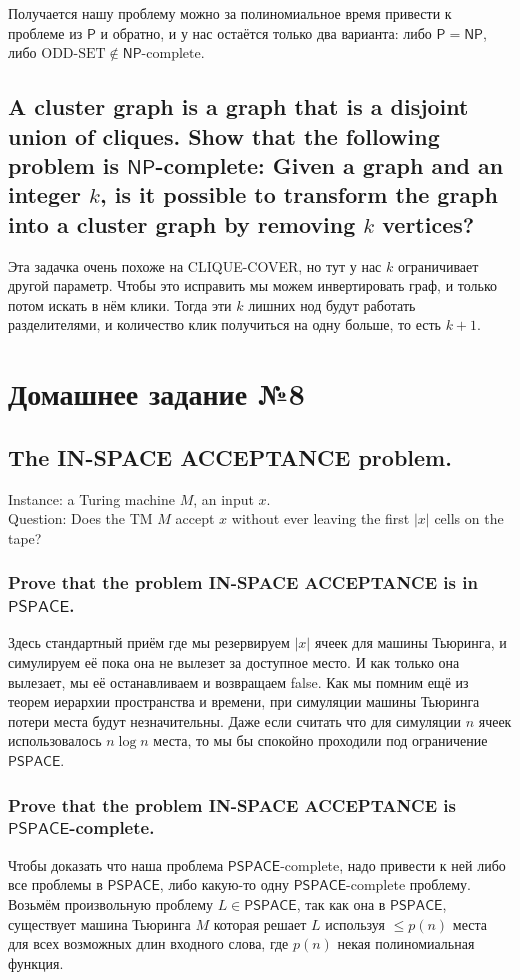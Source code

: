 \documentclass{article}
\newcommand{\NP}{\ensuremath{\mathsf{NP}}}
\newcommand{\PSPACE}{\ensuremath{\mathsf{PSPACE}}}
\renewcommand{\P}{\ensuremath{\mathsf{P}}}
\begin{document}
  Получается нашу проблему можно за полиномиальное время привести к проблеме из \P{} и обратно, и у нас остаётся только два варианта: либо $\P = \NP$, либо $\textrm{ODD-SET} \not\in \NP\textrm{-complete}$.

  \subsection{A cluster graph is a graph that is a disjoint union of cliques. Show that the following problem is \NP-complete: Given a graph and an integer $k$, is it possible to transform the graph into a cluster graph by removing $k$ vertices?}
  Эта задачка очень похоже на CLIQUE-COVER, но тут у нас $k$ ограничивает другой параметр.
  Чтобы это исправить мы можем инвертировать граф, и только потом искать в нём клики.
  Тогда эти $k$ лишних нод будут работать разделителями, и количество клик получиться на одну больше, то есть $k+1$.

  \section{Домашнее задание №8}
  \setcounter{subsection}{7}
  \subsection{The IN-SPACE ACCEPTANCE problem.}
  Instance: a Turing machine $M$, an input $x$.\\
  Question: Does the TM $M$ accept $x$ without ever leaving the first $|x|$ cells on the tape?

  \subsubsection{Prove that the problem IN-SPACE ACCEPTANCE is in \PSPACE.}
  Здесь стандартный приём где мы резервируем $|x|$ ячеек для машины Тьюринга, и симулируем её пока она не вылезет за доступное место.
  И как только она вылезает, мы её останавливаем и возвращаем false.
  Как мы помним ещё из теорем иерархии пространства и времени, при симуляции машины Тьюринга потери места будут незначительны.
  Даже если считать что для симуляции $n$ ячеек использовалось $n\log n$ места, то мы бы спокойно проходили под ограничение \PSPACE.

  \subsubsection{Prove that the problem IN-SPACE ACCEPTANCE is \PSPACE-complete.}
  Чтобы доказать что наша проблема \PSPACE-complete, надо привести к ней либо все проблемы в \PSPACE, либо какую-то одну \PSPACE-complete проблему.
  Возьмём произвольную проблему $L \in \PSPACE$, так как она в \PSPACE, существует машина Тьюринга $M$ которая решает $L$ используя $\leq p(n)$ места для всех возможных длин входного слова, где $p(n)$ некая полиномиальная функция.
\end{document}
